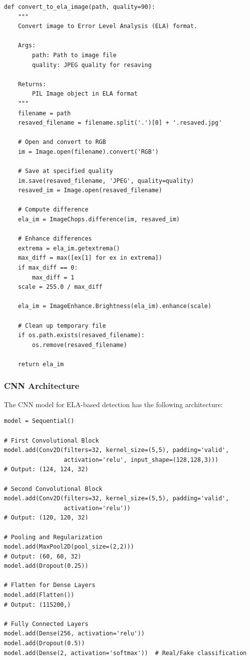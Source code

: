\documentclass[12pt,a4paper]{article}
\begin{document}
\begin{lstlisting}[caption=ELA Conversion Function]
def convert_to_ela_image(path, quality=90):
    """
    Convert image to Error Level Analysis (ELA) format.
    
    Args:
        path: Path to image file
        quality: JPEG quality for resaving
    
    Returns:
        PIL Image object in ELA format
    """
    filename = path
    resaved_filename = filename.split('.')[0] + '.resaved.jpg'
    
    # Open and convert to RGB
    im = Image.open(filename).convert('RGB')
    
    # Save at specified quality
    im.save(resaved_filename, 'JPEG', quality=quality)
    resaved_im = Image.open(resaved_filename)
    
    # Compute difference
    ela_im = ImageChops.difference(im, resaved_im)
    
    # Enhance differences
    extrema = ela_im.getextrema()
    max_diff = max([ex[1] for ex in extrema])
    if max_diff == 0:
        max_diff = 1
    scale = 255.0 / max_diff
    
    ela_im = ImageEnhance.Brightness(ela_im).enhance(scale)
    
    # Clean up temporary file
    if os.path.exists(resaved_filename):
        os.remove(resaved_filename)
    
    return ela_im
\end{lstlisting}

\subsubsection{CNN Architecture}
The CNN model for ELA-based detection has the following architecture:

\begin{lstlisting}[caption=CNN Model Architecture for ELA Detection]
model = Sequential()

# First Convolutional Block
model.add(Conv2D(filters=32, kernel_size=(5,5), padding='valid', 
                 activation='relu', input_shape=(128,128,3)))
# Output: (124, 124, 32)

# Second Convolutional Block
model.add(Conv2D(filters=32, kernel_size=(5,5), padding='valid', 
                 activation='relu'))
# Output: (120, 120, 32)

# Pooling and Regularization
model.add(MaxPool2D(pool_size=(2,2)))
# Output: (60, 60, 32)
model.add(Dropout(0.25))

# Flatten for Dense Layers
model.add(Flatten())
# Output: (115200,)

# Fully Connected Layers
model.add(Dense(256, activation='relu'))
model.add(Dropout(0.5))
model.add(Dense(2, activation='softmax'))  # Real/Fake classification
\end{lstlisting}
\end{document}
